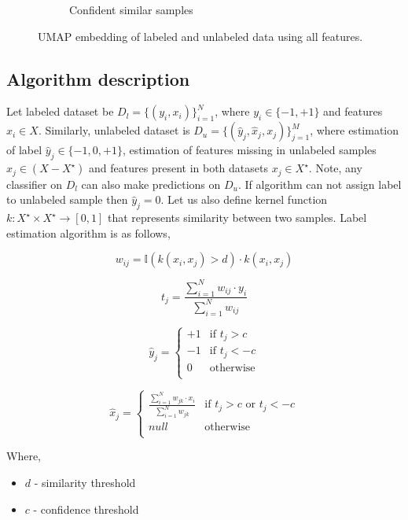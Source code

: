 \documentclass{article}
\begin{document}
\begin{figure}
\begin{subfigure}{.32\textwidth}
        \caption{Confident similar samples}
        \label{fig:alg-confident}
    \end{subfigure}
    \caption{UMAP embedding of labeled and unlabeled data using all features.}
    \label{fig:alg}
\end{figure}

\subsection{Algorithm description}
\label{alg-descr}
Let labeled dataset be $D_l = \{(y_i, x_i)\}_{i=1}^N$, where $y_i \in \{-1, +1\}$ and features $x_i \in X$. Similarly, unlabeled dataset is $D_u = \{(\hat{y}_j, \hat{x}_j, x_j)\}_{j=1}^M$, where estimation of label $\hat{y}_j \in \{-1, 0, +1\}$, estimation of features missing in unlabeled samples $\hat{x}_j \in 
(X - X^{\star})$ and features present in both datasets $x_j \in X^{\star}$. Note, any classifier on $D_l$ can also make predictions on $D_u$. If algorithm can not assign label to unlabeled sample then $\hat{y}_j = 0$. Let us also define kernel function $k \colon X^{\star} \times X^{\star}  \to [0, 1]$ that represents similarity between two samples. Label estimation algorithm is as follows,

$$
w_{ij} = \mathbb{I}(k(x_i, x_j) > d) \cdot k(x_i, x_j)
$$

$$
t_j = \frac{\sum_{i=1}^{N} w_{ij} \cdot y_i}{\sum_{i=1}^{N} w_{ij}}
$$

$$
\hat{y}_{j} = 
\begin{cases}
    +1  & \text{if $t_{j} > c $} \\
    -1  & \text{if $t_{j} < -c $} \\
    0   & \text{otherwise} \\
\end{cases}
$$

$$
\hat{x}_{j} = 
\begin{cases}
    \frac{\sum_{i=1}^{N} w_{jk} \cdot x_i}{\sum_{i=1}^{N} w_{jk}} & \text{if $t_{j} > c $ or $t_{j} < -c $} \\
    \textit{null}   & \text{otherwise} \\
\end{cases}
$$

\begin{samepage}
Where,
\begin{itemize}
    \item[] $d$ - similarity threshold
    \item[] $c$ - confidence threshold
\end{itemize}
\end{samepage}
\end{document}
